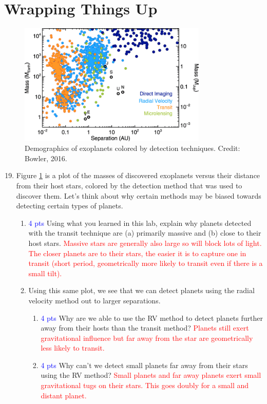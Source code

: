 \documentclass[11pt]{article}
\begin{document}
\section{Wrapping Things Up}

\begin{figure}[h!]
    \centering
    \includegraphics[width=0.8\textwidth]{Images/Exoplanet Demographic Techniques.png}
    \caption{Demographics of exoplanets colored by detection techniques. Credit: Bowler, 2016.}
    \label{fig:techniques}
\end{figure}

\begin{enumerate}
\setcounter{enumi}{18}
    \item Figure \ref{fig:techniques} is a plot of the masses of discovered exoplanets versus their distance from their host stars, colored by the detection method that was used to discover them. Let's think about why certain methods may be biased towards detecting certain types of planets.
    \begin{enumerate}
        \item \textcolor{blue}{4 pts} Using what you learned in this lab, explain why planets detected with the transit technique are (a) primarily massive and (b) close to their host stars. \textcolor{red}{Massive stars are generally also large so will block lots of light.  The closer planets are to their stars, the easier it is to capture one in transit (short period, geometrically more likely to transit even if there is a small tilt).}
        \item Using this same plot, we see that we can detect planets using the radial velocity method out to larger separations.
        \begin{enumerate}
            \item \textcolor{blue}{4 pts} Why are we able to use the RV method to detect planets further away from their hosts than the transit method? \textcolor{red}{Planets still exert gravitational influence but far away from the star are geometrically less likely to transit.}
            \item \textcolor{blue}{4 pts} Why can't we detect small planets far away from their stars using the RV method? \textcolor{red}{Small planets and far away planets exert small gravitational tugs on their stars.  This goes doubly for a small and distant planet.}
        \end{enumerate}
    \end{enumerate}
\end{enumerate}
\end{document}
